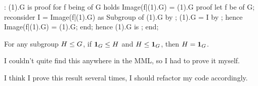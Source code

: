 : (1).G is 
proof
  for f being  of G holds Image(f|(1).G) = (1).G
  proof
    let f be  of G;
    reconsider I = Image(f|(1).G) as Subgroup of (1).G by ;
    (1).G = I by ;
    hence Image(f|(1).G) = (1).G;
  end;
  hence (1).G is ;
end;
\eatline
{}\nwendcode{}\nwdocspar
\begin{lemma}
For any subgroup $H\leq G$, if $\mathbf{1}_{G}\leq H$
and $H\leq\mathbf{1}_{G}$, then $H=\mathbf{1}_{G}$.
\end{lemma}

\begin{lem-remark}
I couldn't quite find this anywhere in the MML, so I had to prove it
myself.
\end{lem-remark}
\begin{lem-remark}[To do]
I think I prove this result several times, I should refactor my code accordingly.
\end{lem-remark}

